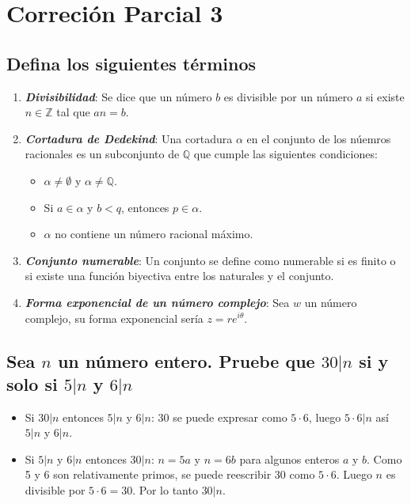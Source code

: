 \documentclass{report}
\begin{document}
    \tableofcontents

    \pagebreak
    \chapter{ Correción Parcial 3 }

    \section{Defina los siguientes términos}

    \begin{enumerate}
        \item \textit{\textbf{Divisibilidad}}: Se dice que un número $b$ es divisible por un número $a$ si existe $n \in \mathbb{Z}$ tal que $an = b$.
        \item \textit{\textbf{Cortadura de Dedekind}}: Una cortadura $\alpha$ en el conjunto de los núemros racionales es un subconjunto de $\mathbb{Q}$ que cumple las siguientes condiciones:
            \begin{itemize}
                \item $\alpha \not = \emptyset$ y $\alpha \not = \mathbb{Q}$.
                \item Si $a \in \alpha$ y $b < q$, entonces $p \in \alpha$.
                \item $\alpha$ no contiene un número racional máximo.
            \end{itemize}
        \item \textit{\textbf{Conjunto numerable}}: Un conjunto se define como numerable si es finito o si existe una función biyectiva entre los naturales y el conjunto.
        \item \textit{\textbf{Forma exponencial de un número complejo}}: Sea $w$ un número complejo, su forma exponencial sería $z = re^{i\theta}$.
    \end{enumerate}

    \section{Sea $n$ un número entero. Pruebe que $30 | n$ si y solo si $5 |n$ y $6|n$}
        \begin{itemize}
            \item Si $30 |n$ entonces $5 |n$ y $6|n$: $30$ se puede expresar como $5 \cdot 6$, luego $5 \cdot 6 |n$ así $5|n$ y $6|n$.
            \item Si $5 |n$ y $6|n$ entonces $30 |n$: $n = 5a$ y $n = 6b$ para algunos enteros $a$ y $b$. Como 5 y 6 son relativamente primos, se puede reescribir 30 como $5 \cdot 6$. Luego $n$ es divisible por $5 \cdot 6 = 30$. Por lo tanto $30|n$.
        \end{itemize}
\end{document}
